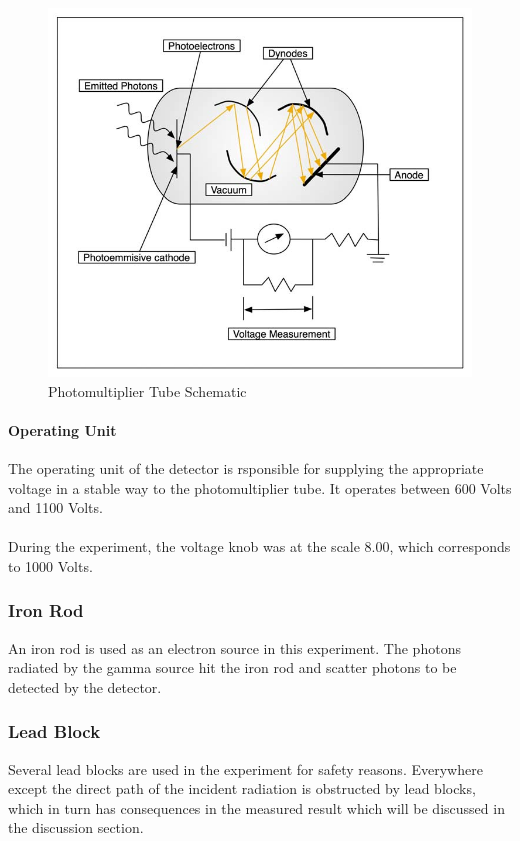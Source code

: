 				\begin{figure}[h]
					\caption{Photomultiplier Tube Schematic}
					\centering
					\includegraphics[width=\textwidth / 2]{images/pmt.png}
				\end{figure}
			
			\paragraph{Operating Unit}
				The operating unit of the detector is rsponsible for supplying the appropriate voltage in a stable way to the photomultiplier tube. It operates between 600 Volts and 1100 Volts.
				\\
				\\
				During the experiment, the voltage knob was at the scale 8.00, which corresponds to 1000 Volts.
		
		\subsubsection{Iron Rod}
			An iron rod is used as an electron source in this experiment. The photons radiated by the gamma source hit the iron rod and scatter photons to be detected by the detector.
		
		\subsubsection{Lead Block}
			Several lead blocks are used in the experiment for safety reasons. Everywhere except the direct path of the incident radiation is obstructed by lead blocks, which in turn has consequences in the measured result which will be discussed in the discussion section.
	
